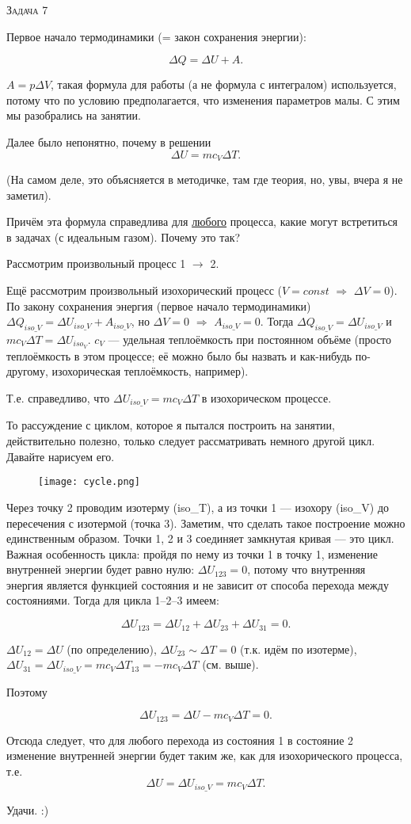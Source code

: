 \documentclass[12pt,a4paper]{article}
\begin{document}
\textsc{Задача 7}

Первое начало термодинамики (= закон сохранения энергии):

$$ \Delta Q = \Delta U + A .$$

$ A = p \Delta V$, такая формула для работы (а не формула с интегралом) используется, потому что по условию предполагается, что изменения параметров малы. С этим мы разобрались на занятии.

Далее было непонятно, почему в решении
$$\Delta U = mc_{V}\Delta T.$$

(На самом деле, это объясняется в методичке, там где теория, но, увы, вчера я не заметил).

Причём эта формула справедлива для \underline{любого} процесса, какие могут встретиться в задачах (с идеальным газом). Почему это так?

Рассмотрим произвольный процесс 1 $\rightarrow$ 2.

Ещё рассмотрим произвольный изохорический процесс ($V = const$ $\Rightarrow$ $\Delta V=0$). По закону сохранения энергия (первое начало термодинамики) $\Delta Q_{iso\_V} = \Delta U_{iso\_V} + A_{iso\_V}$, но $\Delta V = 0$ $\Rightarrow$ $A_{iso\_V} = 0$. Тогда $\Delta Q_{iso\_V} = \Delta U_{iso\_V}$ и $mc_V\Delta T = \Delta U_{iso_V}$. $c_V$ --- удельная теплоёмкость при постоянном объёме (просто теплоёмкость в этом процессе; её можно было бы назвать и как-нибудь по-другому, изохорическая теплоёмкость, например). 

Т.е. справедливо, что $\Delta U_{iso\_V} = mc_V\Delta T$ в изохорическом процессе. 

То рассуждение с циклом, которое я пытался построить на занятии, действительно полезно, только следует рассматривать немного другой цикл. Давайте нарисуем его.

\begin{figure}[h!]
	\texttt{[image: cycle.png]}
\end{figure}

Через точку 2 проводим изотерму (iso\_T), а из точки 1 --- изохору (iso\_V) до пересечения с изотермой (точка 3). Заметим, что сделать такое построение можно единственным образом. Точки 1, 2 и 3 соединяет замкнутая кривая --- это цикл. Важная особенность цикла: пройдя по нему из точки 1 в точку 1, изменение внутренней энергии будет равно нулю: $\Delta U_{123} = 0$, потому что внутренняя энергия является функцией состояния и не зависит от способа перехода между состояниями. Тогда для цикла 1--2--3 имеем:

$$ \Delta U_{123} = \Delta U_{12} + \Delta U_{23} + \Delta U_{31} = 0.$$

$\Delta U_{12} = \Delta U$ (по определению), $\Delta U_{23} \sim \Delta T = 0 $ (т.к. идём по изотерме), $\Delta U_{31} = \Delta U_{iso\_V} = mc_V\Delta T_{13} = -mc_V\Delta T $ (см. выше).

Поэтому 

$$ \Delta U_{123} = \Delta U - mc_V\Delta T = 0.$$

Отсюда следует, что для любого перехода из состояния 1 в состояние 2 изменение внутренней энергии будет таким же, как для изохорического процесса, т.е. 
$$\Delta U = \Delta U_{iso\_V} = mc_V\Delta T.$$

Удачи. :)
\end{document}
